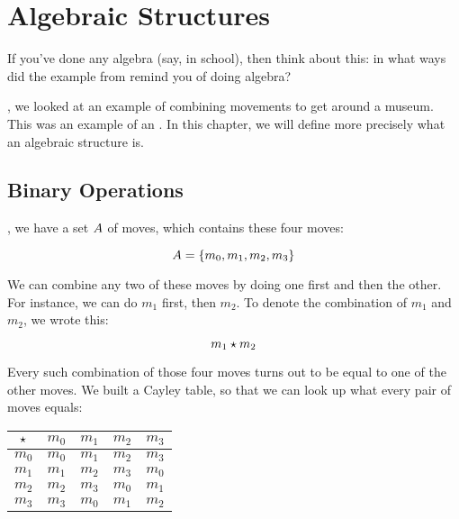 \documentclass[../../../main.tex]{subfiles}
\begin{document}
\chapter{Algebraic Structures}
\label{ch:algebraic-structures}

\begin{ponder}
  If you've done any algebra (say, in school), then think about this: in what ways did the example from  remind you of doing algebra? 
\end{ponder}

, we looked at an example of combining movements to get around a museum. This was an example of an . In this chapter, we will define more precisely what an algebraic structure is.


\section{Binary Operations}

, we have a set $A$ of moves, which contains these four moves:

\begin{equation*}
  A = \{ m_{0}, m_{1}, m_{2}, m_{3} \}
\end{equation*}

We can combine any two of these moves by doing one first and then the other. For instance, we can do $m_{1}$ first, then $m_{2}$. To denote the combination of $m_{1}$ and $m_{2}$, we wrote this:

\begin{equation*}
  m_{1} \opSymbol/ m_{2}
\end{equation*}

Every such combination of those four moves turns out to be equal to one of the other moves. We built a Cayley table, so that we can look up what every pair of moves equals:

\begin{center}
  \begin{tabular}{| c || c | c | c | c |}
    \hline
    $\opSymbol/$ & $m_{0}$ & $m_{1}$ & $m_{2}$ & $m_{3}$ \\ \hline \hline
    $m_{0}$    & $m_{0}$ & $m_{1}$ & $m_{2}$ & $m_{3}$ \\ \hline
    $m_{1}$    & $m_{1}$ & $m_{2}$ & $m_{3}$ & $m_{0}$ \\ \hline
    $m_{2}$    & $m_{2}$ & $m_{3}$ & $m_{0}$ & $m_{1}$ \\ \hline
    $m_{3}$    & $m_{3}$ & $m_{0}$ & $m_{1}$ & $m_{2}$ \\ \hline
  \end{tabular}
\end{center}
\end{document}
